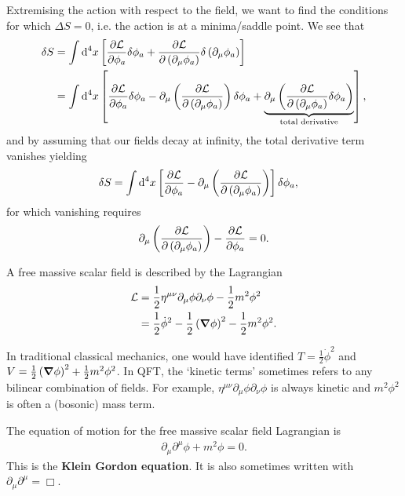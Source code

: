 Extremising the action with respect to the field, we want to find the conditions for which $\Delta S = 0$, i.e. the action is at a minima/saddle point. We see that
\begin{align}
    \delta S &= \int \dd{^{4}x} \left[ \pdv{\mathcal{L}}{\phi_a} \delta \phi_a + \pdv{\mathcal{L}}{\left( \partial_\mu \phi_a \right) } \delta \left( \partial_\mu \phi_a \right)  \right] \\
    &= \int \dd{^{4}x} \left[ \pdv{\mathcal{L}}{\phi_a} \delta \phi_a - \partial_\mu \left( \pdv{\mathcal{L}}{\left( \partial_\mu \phi_a \right) }\right)\delta \phi_a   + \underbrace{\partial_\mu \left( \pdv{\mathcal{L}}{\left( \partial_\mu \phi_a \right) } \delta \phi_a \right)}_{\text{total derivative}}   \right]
,\end{align}
and by assuming that our fields decay at infinity, the total derivative term vanishes yielding
\begin{align}
   \delta S &= \int \dd{^{4}x} \left[ \pdv{\mathcal{L}}{\phi_a}  - \partial_\mu \left( \pdv{\mathcal{L}}{\left( \partial_\mu \phi_a \right) } \right) \right]\delta \phi_a 
,\end{align}
for which vanishing requires
\begin{align}
    \partial_\mu \left( \pdv{\mathcal{L}}{\left( \partial_\mu \phi_a \right) } \right) - \pdv{\mathcal{L}}{\phi_a} = 0
.\end{align}

\begin{example}
    A free massive scalar field is described by the Lagrangian
    \begin{align}
        \mathcal{L} &= \frac{1}{2} \eta^{\mu \nu} \partial_\mu \phi \partial_\nu \phi - \frac{1}{2} m^2 \phi^2 \\
        &= \frac{1}{2} \dot{\phi}^2 - \frac{1}{2} \left( \grad \phi \right)^2 - \frac{1}{2}m^2 \phi^2
    .\end{align}

    In traditional classical mechanics, one would have identified $T = \frac{1}{2} \dot{\phi}^2$ and $V = \frac{1}{2} \left( \grad \phi \right)^2 + \frac{1}{2} m^2 \phi^2$. 
    In QFT, the `kinetic terms' sometimes refers to any bilinear combination of fields. For example, $\eta^{\mu \nu} \partial_\mu \phi \partial_\nu \phi$ is always kinetic and $m^2 \phi^2$ is often a (bosonic) mass term.

    The equation of motion for the free massive scalar field Lagrangian is
    \begin{align}
        \partial_\mu \partial^{\mu} \phi + m^2 \phi = 0
    .\end{align}
    This is the \textbf{Klein Gordon equation}. It is also sometimes written with $\partial_\mu \partial^{\mu} = \Box$.
\end{example}



